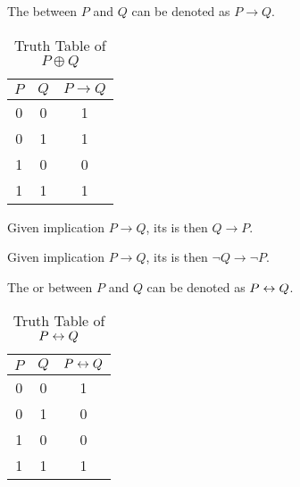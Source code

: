 \begin{definition} \label{def:implication}
    The  between $P$ and $Q$ can be denoted as $P \to Q$.
\end{definition}

\begin{table}[htb]
    \centering
    \begin{tabular}[t]{ccc}
        \toprule
        $P$   & $Q$ & $P \to Q$   \\
        \midrule
        0     & 0   & 1             \\
        0     & 1   & 1             \\
        1     & 0   & 0             \\
        1     & 1   & 1             \\
        \bottomrule
    \end{tabular}
    
    \caption{Truth Table of $P \oplus Q$}
    \label{table:truth_table_implication}
\end{table}

\begin{definition} \label{def:converse}
    Given implication $P \to Q$, its  is then $Q \to P$.
\end{definition}

\begin{definition} \label{def:contrapositive}
    Given implication $P \to Q$, its  is then $\lnot Q \to \lnot P$.
\end{definition}

\begin{definition} \label{def:biconditional}
    The  or  between $P$ and $Q$ can be denoted as $P \leftrightarrow Q$.
\end{definition}

\begin{table}[htb]
    \centering
    \begin{tabular}[t]{ccc}
        \toprule
        $P$   & $Q$ & $P \leftrightarrow Q$   \\
        \midrule
        0     & 0   & 1             \\
        0     & 1   & 0             \\
        1     & 0   & 0             \\
        1     & 1   & 1             \\
        \bottomrule
    \end{tabular}
    
    \caption{Truth Table of $P \leftrightarrow Q$}
    \label{table:truth_table_biconditional}
\end{table}

